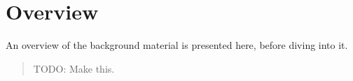 \section{Overview}



An overview of the background material is presented here, before diving into it.

\begin{quote}
  TODO: Make this.
\end{quote}
